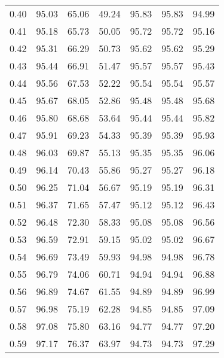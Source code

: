 \begin{tabular}{|c|c|c|c|c|c|c|}
      0.40 &     95.03 &     65.06 &      49.24 &   95.83 &      95.83 &         94.99 \\
      0.41 &     95.18 &     65.73 &      50.05 &   95.72 &      95.72 &         95.16 \\
      0.42 &     95.31 &     66.29 &      50.73 &   95.62 &      95.62 &         95.29 \\
      0.43 &     95.44 &     66.91 &      51.47 &   95.57 &      95.57 &         95.43 \\
      0.44 &     95.56 &     67.53 &      52.22 &   95.54 &      95.54 &         95.57 \\
      0.45 &     95.67 &     68.05 &      52.86 &   95.48 &      95.48 &         95.68 \\
      0.46 &     95.80 &     68.68 &      53.64 &   95.44 &      95.44 &         95.82 \\
      0.47 &     95.91 &     69.23 &      54.33 &   95.39 &      95.39 &         95.93 \\
      0.48 &     96.03 &     69.87 &      55.13 &   95.35 &      95.35 &         96.06 \\
      0.49 &     96.14 &     70.43 &      55.86 &   95.27 &      95.27 &         96.18 \\
      0.50 &     96.25 &     71.04 &      56.67 &   95.19 &      95.19 &         96.31 \\
      0.51 &     96.37 &     71.65 &      57.47 &   95.12 &      95.12 &         96.43 \\
      0.52 &     96.48 &     72.30 &      58.33 &   95.08 &      95.08 &         96.56 \\
      0.53 &     96.59 &     72.91 &      59.15 &   95.02 &      95.02 &         96.67 \\
      0.54 &     96.69 &     73.49 &      59.93 &   94.98 &      94.98 &         96.78 \\
      0.55 &     96.79 &     74.06 &      60.71 &   94.94 &      94.94 &         96.88 \\
      0.56 &     96.89 &     74.67 &      61.55 &   94.89 &      94.89 &         96.99 \\
      0.57 &     96.98 &     75.19 &      62.28 &   94.85 &      94.85 &         97.09 \\
      0.58 &     97.08 &     75.80 &      63.16 &   94.77 &      94.77 &         97.20 \\
      0.59 &     97.17 &     76.37 &      63.97 &   94.73 &      94.73 &         97.29 \\

\end{tabular}
